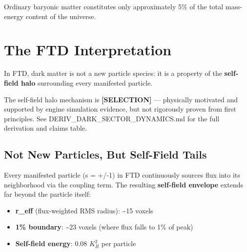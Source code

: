\documentclass[
  11pt,
  letterpaper,
  twoside,
  openright]{book}
\providecommand{\tightlist}{%
  \setlength{\itemsep}{0pt}\setlength{\parskip}{0pt}}
\begin{document}
Ordinary baryonic matter constitutes only approximately 5\% of the total
mass-energy content of the universe.

\section{The FTD Interpretation}\label{the-ftd-interpretation}

In FTD, dark matter is not a new particle species: it is a property of
the \textbf{self-field halo} surrounding every manifested particle.

\begin{tcolorbox}[enhanced jigsaw, coltitle=black, colbacktitle=quarto-callout-warning-color!10!white, toprule=.15mm, colframe=quarto-callout-warning-color-frame, arc=.35mm, opacityback=0, bottomtitle=1mm, toptitle=1mm, breakable, colback=white, titlerule=0mm, opacitybacktitle=0.6, title=\textcolor{quarto-callout-warning-color}{\faExclamationTriangle}\hspace{0.5em}{Epistemic Status}, rightrule=.15mm, bottomrule=.15mm, leftrule=.75mm, left=2mm]

The self-field halo mechanism is \textbf{{[}SELECTION{]}} --- physically
motivated and supported by engine simulation evidence, but not
rigorously proven from first principles. See
DERIV\_DARK\_SECTOR\_DYNAMICS.md for the full derivation and claims
table.

\end{tcolorbox}

\subsection{Not New Particles, But Self-Field
Tails}\label{not-new-particles-but-self-field-tails}

Every manifested particle (s = +/-1) in FTD continuously sources flux
into its neighborhood via the coupling term. The resulting
\textbf{self-field envelope} extends far beyond the particle itself:

\begin{itemize}
\tightlist
\item
  \textbf{r\_eff} (flux-weighted RMS radius): \textasciitilde15 voxels
\item
  \textbf{1\% boundary}: \textasciitilde23 voxels (where flux falls to
  1\% of peak)
\item
  \textbf{Self-field energy}: 0.08 \(K_B^2\) per particle
\end{itemize}
\end{document}
